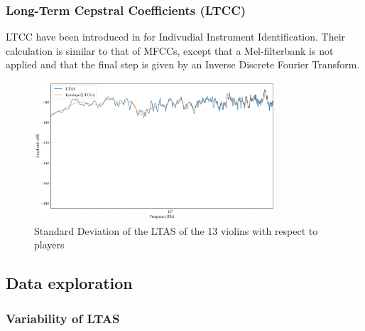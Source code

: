 \documentclass[letterpaper,11pt,leqno]{article}
\begin{document}
\subsubsection{Long-Term Cepstral Coefficients (LTCC)}{
	LTCC have been introduced in \cite{lukasikLongTermCepstral2010b} for Indivudial Instrument Identification. Their calculation is similar to that of MFCCs, except that a Mel-filterbank is not applied and that the final step is given by an Inverse Discrete Fourier Transform. 

	\begin{figure}[!h]
	\end{figure}

	\begin{figure}[!h]
		\includegraphics[width=0.8\textwidth]{../figures/ltcc.png}
		\caption{Standard Deviation of the LTAS of the 13 violins with respect to players}
	\end{figure}
}

\subsection{Data exploration}

\subsubsection{Variability of LTAS}
\end{document}
